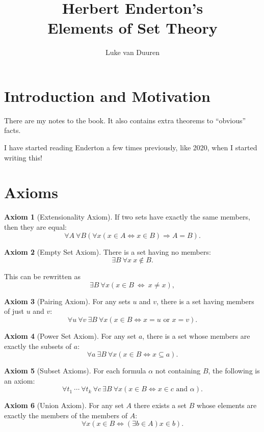 \documentclass[12pt]{article}
\author{Luke van Duuren}
\title{Herbert Enderton's\\ Elements of Set Theory}
\theoremstyle{plain}
\theoremstyle{remark}
\theoremstyle{definition}
\newtheorem{axiom}{Axiom}[section]
\theoremstyle{remark}
\renewcommand{\iff}{\Leftrightarrow}
\begin{document}
\maketitle

\section{Introduction and Motivation}
There are my notes to the book. It also contains extra theorems to ``obvious'' facts.

I have started reading Enderton a few times previously, like 2020, when I started writing this!

\section{Axioms}
\begin{axiom}[Extensionality Axiom]\label{extensionality}
  If two sets have exactly the same members, then they are equal:
  \[
    \forall A\ \forall B \left(\forall x(x \in A \Leftrightarrow x \in B) \Rightarrow A = B\right).
  \]
\end{axiom}

\begin{axiom}[Empty Set Axiom] There is a set having no members:
  \[
    \exists B \ \forall x \ x \not\in B.
  \]
\end{axiom}

This can be rewritten as
\[
  \exists B \ \forall x (x \in B\ \iff\ x \neq x),
\]
\begin{axiom}[Pairing Axiom] For any sets $u$ and $v$, there is a set having members of just $u$ and $v$:
  \[
    \forall u\ \forall v\ \exists B\ \forall x(x \in B \Leftrightarrow x = u \text{ or } x = v).
  \]
\end{axiom}

\begin{axiom}[Power Set Axiom] For any set $a$, there is a set whose members are exactly the subsets of $a$:
  \[
    \forall a\ \exists B\ \forall x(x \in B \Leftrightarrow x \subseteq a).
  \]
\end{axiom}

\begin{axiom}[Subset Axioms]
  For each formula $\alpha$ not containing $B$, the following is an axiom:
  \[
    \forall t_1\ \cdots\ \forall t_k\ \forall c\ \exists B\ \forall x(x \in B \Leftrightarrow x \in c \text{ and } \alpha).
  \]
\end{axiom}

\begin{axiom}[Union Axiom]
  For any set $A$ there exists a set $B$ whose elements are exactly the members of the members of $A$:
  \[
    \forall x(x \in B \Leftrightarrow (\exists b \in A) x \in b).
  \]
\end{axiom}
\end{document}
